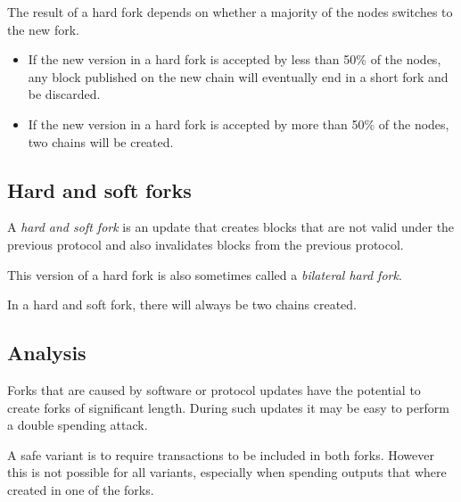 \begin{note}
The result of a hard fork depends on whether a majority of the nodes switches to the new fork.
\begin{itemize}
	\item If the new version in a hard fork is accepted by less than 50\% of the nodes, any block published on the new chain will eventually end in a short fork and be discarded.
	\item If the new version in a hard fork is accepted by more than 50\% of the nodes, two chains will be created.
\end{itemize}
\end{note}

\subsection{Hard and soft forks}
\begin{definition} A \emph{hard and soft fork} is an update that creates blocks that are not valid under the previous protocol and also invalidates blocks from the previous protocol.
\end{definition}
This version of a hard fork is also sometimes called a \emph{bilateral hard fork}. 

\begin{note}
In a hard and soft fork, there will always be two chains created.
\end{note}


\subsection{Analysis}
Forks that are caused by software or protocol updates have the potential to create forks of significant length. During such updates it may be easy to perform a double spending attack.

A safe variant is to require transactions to be included in both forks. However this is not possible for all variants, especially when spending outputs that where created in one of the forks.

